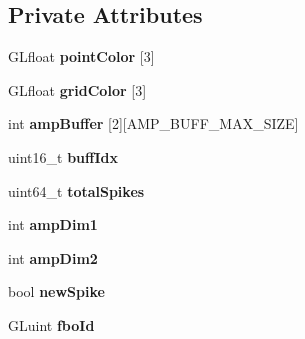 \subsection*{Private Attributes}
\begin{DoxyCompactItemize}
\item 
\hypertarget{classProjectionAxes_a189c8dba7710b4b7939f69ee4972aa62}{G\-Lfloat {\bfseries point\-Color} \mbox{[}3\mbox{]}}\label{classProjectionAxes_a189c8dba7710b4b7939f69ee4972aa62}

\item 
\hypertarget{classProjectionAxes_aa416fc33e07f3784775f60d8d473414a}{G\-Lfloat {\bfseries grid\-Color} \mbox{[}3\mbox{]}}\label{classProjectionAxes_aa416fc33e07f3784775f60d8d473414a}

\item 
\hypertarget{classProjectionAxes_ae504a51a628ee4b473fbf63f1fce36e7}{int {\bfseries amp\-Buffer} \mbox{[}2\mbox{]}\mbox{[}A\-M\-P\-\_\-\-B\-U\-F\-F\-\_\-\-M\-A\-X\-\_\-\-S\-I\-Z\-E\mbox{]}}\label{classProjectionAxes_ae504a51a628ee4b473fbf63f1fce36e7}

\item 
\hypertarget{classProjectionAxes_a7fbced8c262d9c180629d2bac7c390b7}{uint16\-\_\-t {\bfseries buff\-Idx}}\label{classProjectionAxes_a7fbced8c262d9c180629d2bac7c390b7}

\item 
\hypertarget{classProjectionAxes_a467cfa2f128518849701846512989fda}{uint64\-\_\-t {\bfseries total\-Spikes}}\label{classProjectionAxes_a467cfa2f128518849701846512989fda}

\item 
\hypertarget{classProjectionAxes_af30eec2bec1ee2c4bf455f9af75a329e}{int {\bfseries amp\-Dim1}}\label{classProjectionAxes_af30eec2bec1ee2c4bf455f9af75a329e}

\item 
\hypertarget{classProjectionAxes_afee898e5030d22ccf8638dd838f45412}{int {\bfseries amp\-Dim2}}\label{classProjectionAxes_afee898e5030d22ccf8638dd838f45412}

\item 
\hypertarget{classProjectionAxes_acaeacee8aecad5416a06fbbd3526032a}{bool {\bfseries new\-Spike}}\label{classProjectionAxes_acaeacee8aecad5416a06fbbd3526032a}

\item 
\hypertarget{classProjectionAxes_ad36f7f83c3290d9d4f19e7d1a55bbd43}{G\-Luint {\bfseries fbo\-Id}}\label{classProjectionAxes_ad36f7f83c3290d9d4f19e7d1a55bbd43}


\end{DoxyCompactItemize}
